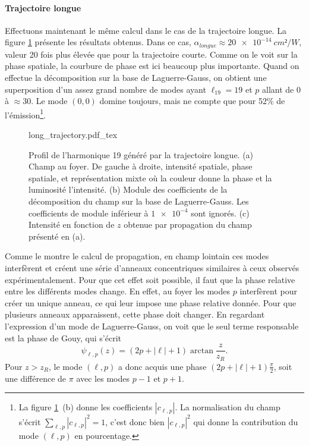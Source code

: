 \paragraph*{Trajectoire longue} Effectuons maintenant le même calcul dans le cas de la trajectoire longue. La figure \ref{Fig:DecompLong} présente les résultats obtenus. Dans ce cas, $\alpha_{longue}\approx\SI{20e-14}{cm²/W}$, valeur 20 fois plus élevée que pour la trajectoire courte. Comme on le voit sur la phase spatiale, la courbure de phase est ici beaucoup plus importante. Quand on effectue la décomposition sur la base de Laguerre-Gauss, on obtient une superposition d'un assez grand nombre de modes ayant $\ell_{19}=19$ et $p$ allant de 0 à $\approx 30$. Le mode $(0,0)$ domine toujours, mais ne compte que pour 52\% de l'émission\footnote{La figure \ref{Fig:DecompLong}~(b) donne les coefficients $\left|c_{\ell,p}\right|$. La normalisation du champ s'écrit $\sum_{\ell,p}{\left|c_{\ell,p}\right|^2} = 1$, c'est donc bien $\left|c_{\ell,p}\right|^2$ qui donne la contribution du mode $(\ell,p)$ en pourcentage.}. 

\begin{figure}[!ht]
\centering
\def\svgwidth{\columnwidth}
{long_trajectory.pdf_tex}
\caption{Profil de l'harmonique 19 généré par la trajectoire longue. (a) Champ au foyer. De gauche à droite, intensité spatiale, phase spatiale, et représentation mixte où la couleur donne la phase et la luminosité l'intensité. (b) Module des coefficients de la décomposition du champ sur la base de Laguerre-Gauss. Les coefficients de module inférieur à $\num{1e-4}$ sont ignorés. (c) Intensité en fonction de $z$ obtenue par propagation du champ présenté en (a).}
\label{Fig:DecompLong}
\end{figure}

Comme le montre le calcul de propagation, en champ lointain ces modes interfèrent et créent une série d'anneaux concentriques similaires à ceux observés expérimentalement. Pour que cet effet soit possible, il faut que la phase relative entre les différents modes change. En effet, au foyer les modes $p$ interfèrent pour créer un unique anneau, ce qui leur impose une phase relative donnée. Pour que plusieurs anneaux apparaissent, cette phase doit changer. En regardant l'expression d'un mode de Laguerre-Gauss, on voit que le seul terme responsable est la phase de Gouy, qui s'écrit
\begin{equation*}
\psi _{\ell ,p}(z)=(2p+\left|\ell\right|+1)\arctan{\frac{z}{z_R}}.
\end{equation*}
Pour $z>z_R$, le mode $(\ell,p)$ a donc acquis une phase $(2p+\left|\ell\right|+1)\frac{\pi}{2}$, soit une différence de $\pi$ avec les modes $p-1$ et $p+1$. 

